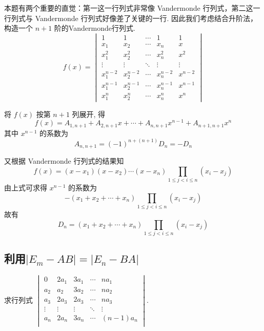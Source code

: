 \begin{solution}
    本题有两个重要的直觉：第一这一行列式非常像 Vandermonde 行列式，第二这一行列式与 Vandermonde 行列式好像差了关键的一行. 因此我们考虑结合升阶法，构造一个 $n+1$ 阶的Vandermonde行列式.
    \[ f(x)=\begin{vmatrix}
            1         & 1         & \cdots & 1         & 1       \\
            x_1       & x_2       & \cdots & x_n       & x       \\
            x_1^{2}   & x_2^{2}   & \cdots & x_n^{2}   & x^{2}   \\
            \vdots    & \vdots    & \ddots & \vdots    & \vdots  \\
            x_1^{n-2} & x_2^{n-2} & \cdots & x_n^{n-2} & x^{n-2} \\
            x_1^{n-1} & x_2^{n-1} & \cdots & x_n^{n-1} & x^{n-1} \\
            x_1^{n}   & x_2^{n}   & \cdots & x_n^{n}   & x^{n}
        \end{vmatrix} \]

    将 $f(x)$ 按第 $n+1$ 列展开, 得
    \[ f(x)=A_{1, n+1}+A_{2, n+1} x+\cdots+A_{n, n+1} x^{n-1}+A_{n+1, n+1} x^{n} \]
    其中 $x^{n-1}$ 的系数为
    \[ A_{n, n+1}=(-1)^{n+(n+1)} D_n=-D_n \]

    又根据 Vandermonde 行列式的结果知
    \[ f(x)=(x-x_1)(x-x_2)\cdots(x-x_n) \prod_{1 \leqslant j<i \leqslant n}(x_i-x_j) \]
    由上式可求得 $x^{n-1}$ 的系数为
    \[ -(x_1+x_2+\cdots+x_n) \prod_{1 \leqslant j<i \leqslant n}(x_i-x_j) \]
    故有
    \[ D_n=(x_1+x_2+\cdots+x_n) \prod_{1 \leqslant j<i \leqslant n}(x_i-x_j) \]
\end{solution}

\subsection{利用$|E_m-AB|=|E_n-BA|$} \label{sec:利用|E_m-AB|=|E_n-BA|}

\begin{example}{}{}
    求行列式 $\begin{vmatrix}
            0      & 2a_1   & 3a_1   & \cdots & na_1     \\
            a_2    & a_2    & 3a_2   & \cdots & na_2     \\
            a_3    & 2a_3   & 2a_3   & \cdots & na_3     \\
            \vdots & \vdots & \vdots & \ddots & \vdots   \\
            a_n    & 2a_n   & 3a_n   & \cdots & (n-1)a_n \\
        \end{vmatrix}$.
\end{example}

